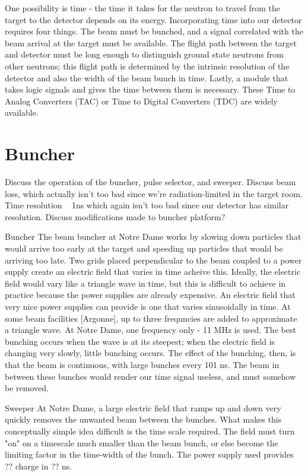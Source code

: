 One possibility is time - the time it takes for the neutron to travel from the target to the detector depends on its energy.  Incorporating time into our detector requires four things.  The beam must be bunched, and a signal correlated with the beam arrival at the target must be available.  The flight path between the target and detector must be long enough to distinguish ground state neutrons from other neutrons; this flight path is determined by the intrinsic resolution of the detector and also the width of the beam bunch in time.  Lastly, a module that takes logic signals and gives the time between them is necessary.  These Time to Analog Converters (TAC) or Time to Digital Converters (TDC) are widely available.

\section{Buncher}
Discuss the operation of the buncher, pulse selector, and sweeper.  Discuss beam loss, which actually isn't too bad since we're radiation-limited in the target room.
Time resolution ~ 1ns which again isn't too bad since our detector has similar resolution.
Discuss modifications made to buncher platform?

Buncher
The beam buncher at Notre Dame works by slowing down particles that would arrive too early at the target and speeding up particles that would be arriving too late.  Two grids placed perpendicular to the beam coupled to a power supply create an electric field that varies in time acheive this.  Ideally, the electric field would vary like a triangle wave in time, but this is difficult to achieve in practice because the power supplies are already expensive.  An electric field that very nice power supplies can provide is one that varies sinusoidally in time.  At some beam facilities [Argonne], up to three frequncies are added to approximate a triangle wave.  At Notre Dame, one frequency only - 11 MHz is used.  The best bunching occurs when the wave is at its steepest; when the electric field is changing very slowly, little bunching occurs.  The effect of the bunching, then, is that the beam is continuous, with large bunches every 101 ns.  The beam in between these bunches would render our time signal useless, and must somehow be removed.

Sweeper
At Notre Dame, a large electric field that ramps up and down very quickly removes the unwanted beam between the bunches.  What makes this conceptually simple idea difficult is the time scale required.  The field must turn "on" on a timescale much smaller than the beam bunch, or else become the limiting factor in the time-width of the bunch.  The power supply used provides ?? charge in ?? ns.

